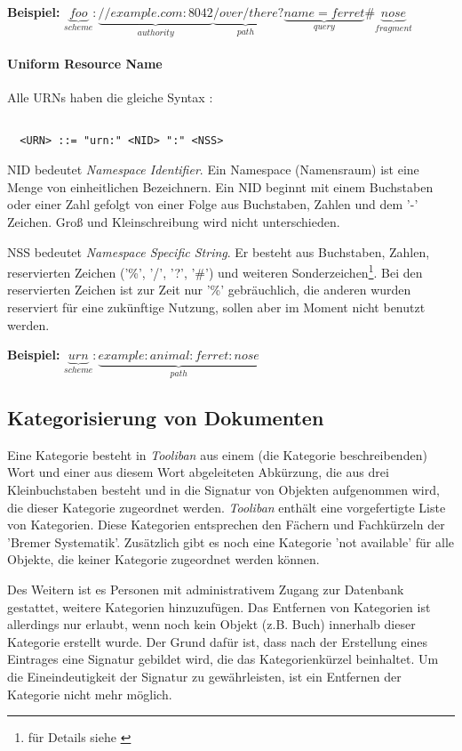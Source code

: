 \noindent \textbf{Beispiel:} $\underbrace{foo}_{scheme}:\underbrace{//example.com:8042}_{authority}
\underbrace{/over/there}_{path}?\underbrace{name=ferret}_{query}\#\underbrace{nose}_{fragment}$


\paragraph{Uniform Resource Name}

Alle URNs haben die gleiche Syntax \cite{rfc2141}:

\begin{verbatim}

  <URN> ::= "urn:" <NID> ":" <NSS>

\end{verbatim}

NID bedeutet \textit{Namespace Identifier}. Ein Namespace (Namensraum) ist eine Menge von einheitlichen
Bezeichnern. Ein NID beginnt mit einem Buchstaben oder einer Zahl gefolgt von einer Folge aus 
Buchstaben, Zahlen und dem '-' Zeichen. Gro{\ss} und Kleinschreibung wird nicht unterschieden.

NSS bedeutet \textit{Namespace Specific String}. Er besteht aus Buchstaben, Zahlen, reservierten
Zeichen ('\%', '/', '?', '\#') und weiteren Sonderzeichen\footnote{f\"ur Details siehe \cite{rfc2141}}.
Bei den reservierten Zeichen ist zur Zeit nur '\%' gebr\"auchlich, die anderen wurden reserviert f\"ur
eine zuk\"unftige Nutzung, sollen aber im Moment nicht benutzt werden.

\noindent \textbf{Beispiel:} $\underbrace{urn}_{scheme}:\underbrace{example:animal:ferret:nose}_{path}$


\subsection{Kategorisierung von Dokumenten}

Eine Kategorie  besteht in \textit{Tooliban} aus einem (die Kategorie beschreibenden) Wort und einer
aus diesem Wort abgeleiteten Abk\"urzung, die aus drei Kleinbuchstaben besteht und in die Signatur 
von Objekten  aufgenommen wird, die dieser Kategorie zugeordnet werden. \textit{Tooliban} enth\"alt 
eine vorgefertigte Liste von Kategorien. Diese Kategorien entsprechen den F\"achern und Fachk\"urzeln 
der  'Bremer Systematik'. Zus\"atzlich gibt es noch eine Kategorie 'not available' f\"ur alle
Objekte, die keiner Kategorie zugeordnet werden k\"onnen.

Des Weitern ist es Personen mit administrativem Zugang zur Datenbank gestattet, weitere Kategorien 
hinzuzuf\"ugen. Das Entfernen von Kategorien ist allerdings nur erlaubt, wenn noch kein Objekt (z.B. Buch)
innerhalb dieser Kategorie erstellt wurde. Der Grund daf\"ur ist, dass nach der Erstellung eines 
Eintrages eine Signatur gebildet wird, die das Kategorienk\"urzel beinhaltet. Um die Eineindeutigkeit
der Signatur zu gew\"ahrleisten, ist ein Entfernen der Kategorie nicht mehr m\"oglich.

